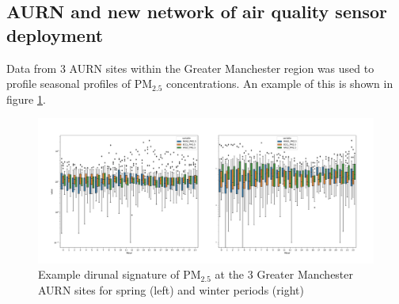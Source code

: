 \documentclass{article}
\begin{document}
\clearpage
\subsection{AURN and new network of air quality sensor deployment}


Data from 3 AURN sites within the Greater Manchester region was used to profile seasonal profiles of PM$_{2.5}$ concentrations. An example of this is shown in figure \ref{fig::AURNexample}.\\

\begin{figure}
	\centering
	\includegraphics[width=0.95\linewidth]{Figures/profilespm25.png}		
	\caption{Example dirunal signature of PM$_{2.5}$ at the 3 Greater Manchester AURN sites for spring (left) and winter periods (right)} \label{fig::AURNexample}
\end{figure}
\end{document}
